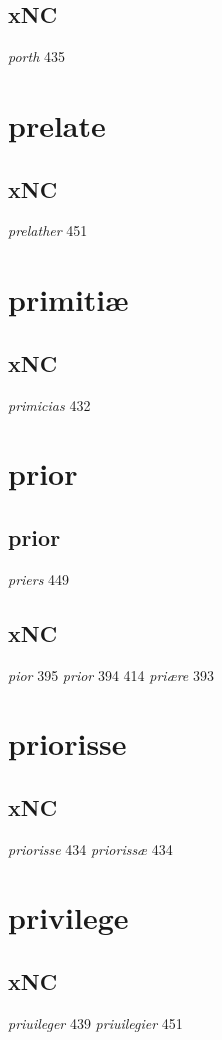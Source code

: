 \documentclass[a4paper,twocolumn]{article}
\begin{document}
\subsection{xNC}
\label{sec:org8647d97}
\emph{porth} 435 
\section{prelate}
\label{sec:orgd0a2a8c}
\subsection{xNC}
\label{sec:orgaf40b65}
\emph{prelather} 451 
\section{primitiæ}
\label{sec:org186ade6}
\subsection{xNC}
\label{sec:org0dc2d0d}
\emph{primicias} 432 
\section{prior}
\label{sec:org9424b81}
\subsection{prior}
\label{sec:org6a087a5}
\emph{priers} 449 
\subsection{xNC}
\label{sec:org27bdaf9}
\emph{pior} 395 \emph{prior} 394 414 \emph{priære} 393 
\section{priorisse}
\label{sec:org9094adc}
\subsection{xNC}
\label{sec:org46c1768}
\emph{priorisse} 434 \emph{priorissæ} 434 
\section{privilege}
\label{sec:orgef011c2}
\subsection{xNC}
\label{sec:orgbd6c5ab}
\emph{priuileger} 439 \emph{priuilegier} 451 
\end{document}
